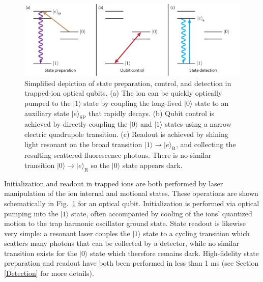 \documentclass[%
reprint,
 amsmath,amssymb,
]{revtex4-1}
\newcommand{\zero}{|0 \rangle}
\newcommand{\one}{|1 \rangle}
\begin{document}
\begin{figure}[t b h]
\includegraphics[width=2.0\columnwidth]{StatePrepv3.pdf}
\caption{Simplified depiction of state preparation, control, and detection in trapped-ion optical qubits. (a) The ion can be quickly optically pumped to the $\one$ state by coupling the long-lived $\zero$ state to an auxiliary state $|e\rangle_{\mathrm{SP}}$ that rapidly decays. (b) Qubit control is achieved by directly coupling the $\zero$ and $\one$ states using a narrow electric quadrupole transition. (c) Readout is achieved by shining light resonant on the broad transition $\one \rightarrow | e \rangle_{\mathrm{R}}$, and collecting the resulting scattered fluorescence photons. There is no similar transition $\zero \rightarrow | e \rangle_{\mathrm{R}}$ so the $\zero$ state appears dark.}
\label{fig:stateprep}
\end{figure}

Initialization and readout in trapped ions are both performed by laser manipulation of the ion internal and motional states. These operations are shown schematically in Fig.~\ref{fig:stateprep} for an optical qubit. Initialization is performed via optical pumping into the $\one$ state, often accompanied by cooling of the ions' quantized motion to the trap harmonic oscillator ground state.  State readout is likewise very simple: a resonant laser couples the $\one$ state to a cycling transition which scatters many photons that can be collected by a detector, while no similar transition exists for the $\zero$ state which therefore remains dark. High-fidelity state preparation and readout have both been performed in less than 1 ms \cite{MyersonReadoutIons2008, HartyHighFidelityIons2014, CrainSNSPDdetect2019} (see Section \ref{Detection} for more details).
\end{document}
